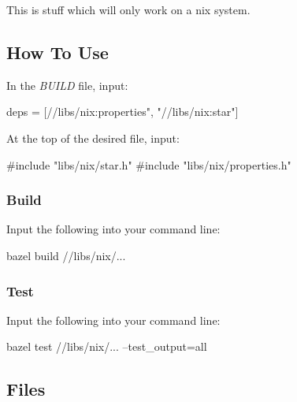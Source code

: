 This is stuff which will only work on a nix system.

\subsection*{How To Use}

In the {\itshape B\+U\+I\+LD} file, input\+: 
\begin{DoxyCode}
deps = [//libs/nix:properties", "//libs/nix:star"]
\end{DoxyCode}
 At the top of the desired file, input\+: 
\begin{DoxyCode}
#include "libs/nix/star.h"
#include "libs/nix/properties.h"
\end{DoxyCode}


\subsubsection*{Build}

Input the following into your command line\+: 
\begin{DoxyCode}
bazel build //libs/nix/...
\end{DoxyCode}


\subsubsection*{Test}

Input the following into your command line\+: 
\begin{DoxyCode}
bazel test //libs/nix/... --test\_output=all
\end{DoxyCode}


\subsection*{Files}


